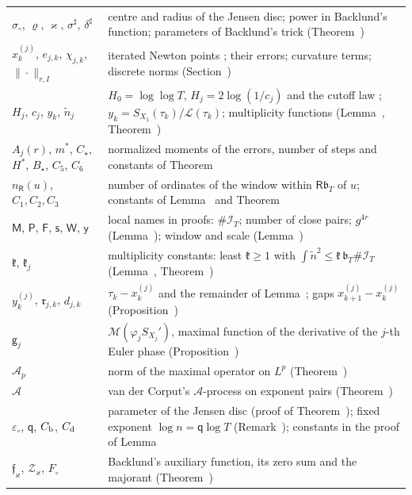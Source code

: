 \documentclass[preprint,12pt]{elsarticle}
\makeatletter
\let\CG@origref\ref
\let\CG@origeqref\eqref
\newcommand{\CG@gettip}[1]{\@ifundefined{CGTip@#1}{Reference: #1}{\csname CGTip@#1\endcsname}}
\DeclareRobustCommand{\CGref}[1]{\pdftooltip{\CG@origref{#1}}{\CG@gettip{#1}}}
\DeclareRobustCommand{\CGeqref}[1]{\pdftooltip{\CG@origeqref{#1}}{\CG@gettip{#1}}}
\numberwithin{equation}{section}
\theoremstyle{plain}
\theoremstyle{definition}
\theoremstyle{remark}
\newcommand{\lL}{\mathcal L}
\newcommand{\IT}{\mathcal I_T}
\makeatother
\begin{document}
\begin{center}
\begin{longtable}{p{}p{}}
$\sigma_\circ$, $\varrho$, $\varkappa$, $\sigma^\sharp$, $\delta^\sharp$ & centre and radius of the Jensen disc; power in Backlund's function; parameters of Backlund's trick (Theorem~\CGref{thm:known_backlund})\\
$x^{(j)}_k$, $e_{j,k}$, $\chi_{j,k}$, $\|\cdot\|_{r,I}$ & iterated Newton points \CGeqref{eq:newton_iteration}; their errors; curvature terms; discrete norms (Section~\CGref{sec:iteration})\\
$H_j$, $c_j$, $y_k$, $\tilde n_j$ & $H_0=\log\log T$, $H_j=2\log(1/c_j)$ and the cutoff law \CGeqref{eq:cutoff_law}; $y_k=S_{X_1}(\tau_k)/\lL(\tau_k)$; multiplicity functions (Lemma~\CGref{lem:multiplicity}, Theorem~\CGref{thm:multiplicity_all})\\
$A_j(r)$, $m^*$, $C_\star$, $H^*$, $B_\star$, $C_5$, $C_6$ & normalized moments of the errors, number of steps and constants of Theorem~\CGref{thm:uniform_iteration}\\
$n_{\mathsf R}(u)$, $C_1,C_2,C_3$ & number of ordinates of the window within $\mathsf R\mathfrak b_T$ of $u$; constants of Lemma~\CGref{lem:zero_pairs} and Theorem~\CGref{thm:multiplicity_all}\\
$\mathsf M$, $\mathsf P$, $\mathsf F$, $\mathsf s$, $\mathsf W$, $\mathsf y$ & local names in proofs: $\#\IT$; number of close pairs; $g^{4r}$ (Lemma~\CGref{lem:sampling_rho}); window and scale (Lemma~\CGref{lem:maximal_primes})\\
$\mathfrak k$, $\mathfrak k_j$ & multiplicity constants: least $\mathfrak k\ge1$ with $\int\tilde n^2\le\mathfrak k\,\mathfrak b_T\#\IT$ (Lemma~\CGref{lem:sampling_rho}, Theorem~\CGref{thm:uniform_iteration})\\
$y^{(j)}_k$, $\mathfrak r_{j,k}$, $d_{j,k}$ & $\tau_k-x^{(j)}_k$ and the remainder of Lemma~\CGref{lem:second_identity}; gaps $x^{(j)}_{k+1}-x^{(j)}_k$ (Proposition~\CGref{prop:deformation})\\
$\mathsf g_j$ & $\mathcal M(\varphi_jS_{X_j}')$, maximal function of the derivative of the $j$-th Euler phase (Proposition~\CGref{prop:recursion})\\
$\mathcal A_p$ & norm of the maximal operator on $L^p$ (Theorem~\CGref{thm:known_maximal})\\
$\mathscr A$ & van der Corput\textquoteright s $\mathscr A$-process on exponent pairs (Theorem~\CGref{thm:known_exponents})\\
$\varepsilon_\circ$, $\mathsf q$, $C_{\rm b}$, $C_{\rm d}$ & parameter of the Jensen disc (proof of Theorem~\CGref{thm:envelope}); fixed exponent $\log n=\mathsf q\log T$ (Remark~\CGref{rem:transport}); constants in the proof of Lemma~\CGref{lem:higher_moments}\\
$\mathfrak f_\varkappa$, $\mathcal Z_\varkappa$, $F_\circ$ & Backlund's auxiliary function, its zero sum and the majorant (Theorem~\CGref{thm:known_backlund})\\
\end{longtable}
\end{center}
\end{document}
